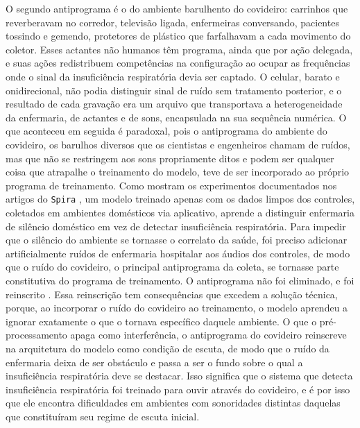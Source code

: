 O segundo antiprograma é o do ambiente barulhento do covideiro: carrinhos que reverberavam no corredor, televisão ligada, enfermeiras conversando, pacientes tossindo e gemendo, protetores de plástico que farfalhavam a cada movimento do coletor. Esses actantes não humanos têm programa, ainda que por ação delegada, e suas ações redistribuem competências na configuração ao ocupar as frequências onde o sinal da insuficiência respiratória devia ser captado. O celular, barato e onidirecional, não podia distinguir sinal de ruído sem tratamento posterior, e o resultado de cada gravação era um arquivo que transportava a heterogeneidade da enfermaria, de actantes e de sons, encapsulada na sua sequência numérica. O que aconteceu em seguida é paradoxal, pois o antiprograma do ambiente do covideiro, os barulhos diversos que os cientistas e engenheiros chamam de ruídos, mas que não se restringem aos sons propriamente ditos e podem ser qualquer coisa que atrapalhe o treinamento do modelo, teve de ser incorporado ao próprio programa de treinamento. Como mostram os experimentos documentados nos artigos do \texttt{Spira} \parencite{Casanova2021DeepLearning}, um modelo treinado apenas com os dados limpos dos controles, coletados em ambientes domésticos via aplicativo, aprende a distinguir enfermaria de silêncio doméstico em vez de detectar insuficiência respiratória. Para impedir que o silêncio do ambiente se tornasse o correlato da saúde, foi preciso adicionar artificialmente ruídos de enfermaria hospitalar aos áudios dos controles, de modo que o ruído do covideiro, o principal antiprograma da coleta, se tornasse parte constitutiva do programa de treinamento. O antiprograma não foi eliminado, e foi reinscrito \parencite{Latour2000BerlinKey}. Essa reinscrição tem consequências que excedem a solução técnica, porque, ao incorporar o ruído do covideiro ao treinamento, o modelo aprendeu a ignorar exatamente o que o tornava específico daquele ambiente. O que o pré-processamento apaga como interferência, o antiprograma do covideiro reinscreve na arquitetura do modelo como condição de escuta, de modo que o ruído da enfermaria deixa de ser obstáculo e passa a ser o fundo sobre o qual a insuficiência respiratória deve se destacar. Isso significa que o sistema que detecta insuficiência respiratória foi treinado para ouvir através do covideiro, e é por isso que ele encontra dificuldades em ambientes com sonoridades distintas daquelas que constituíram seu regime de escuta inicial.

